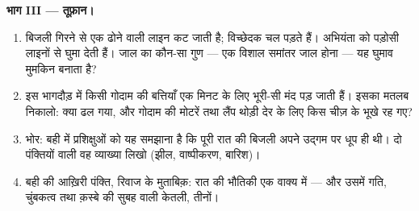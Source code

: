 \begin{problem}
\medskip\noindent\textbf{भाग III --- तूफ़ान।}
\begin{enumerate}[resume]
  \item बिजली गिरने से एक ढोने वाली लाइन कट जाती है; विच्छेदक चल
        पड़ते हैं। अभियंता  को पड़ोसी लाइनों से घुमा देती हैं।
        जाल का कौन-सा गुण --- एक विशाल समांतर जाल होना --- यह
        घुमाव मुमकिन बनाता है?
  \item इस भागदौड़ में किसी गोदाम की बत्तियाँ एक मिनट के लिए भूरी-सी
        मंद पड़ जाती हैं। इसका मतलब निकालो: क्या ढल गया, और गोदाम की
        मोटरें तथा लैंप थोड़ी देर के लिए किस चीज़ के भूखे रह गए?
  \item भोर: बही में प्रशिक्षुओं को यह समझाना है कि पूरी रात की बिजली
        अपने उद्गम पर धूप ही थी। दो पंक्तियों वाली वह व्याख्या लिखो
        (झील, वाष्पीकरण, बारिश)।
  \item बही की आख़िरी पंक्ति, रिवाज के मुताबिक़: रात की भौतिकी एक वाक्य
        में --- और उसमें गति, चुंबकत्व तथा क़स्बे की सुबह वाली केतली,
        तीनों।
\end{enumerate}
\end{problem}
